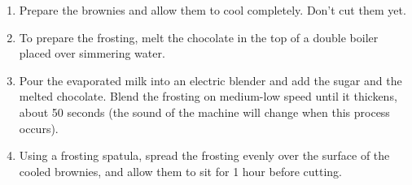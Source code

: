 
\begin{ingredients}
\end{ingredients}

\begin{recipe}
  \begin{enumerate}
  \item Prepare the brownies and allow them to cool completely.  Don't cut them yet.

  \item To prepare the frosting, melt the chocolate in the top of a double
boiler placed over simmering water.

\item Pour the evaporated milk into an electric blender and add the sugar
and the melted chocolate.  Blend the frosting on medium-low speed
until it thickens, about 50 seconds (the sound of the machine will
change when this process occurs).

\item Using a frosting spatula, spread the frosting evenly over the surface
of the cooled brownies, and allow them to sit for 1 hour before
cutting.
  \end{enumerate}
\end{recipe}
                                                                                

